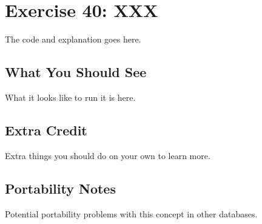 \chapter{Exercise 40: XXX}


The code and explanation goes here.

\section{What You Should See}

What it looks like to run it is here.

\section{Extra Credit}

Extra things you should do on your own to learn more.

\section{Portability Notes}

Potential portability problems with this concept in other databases.

